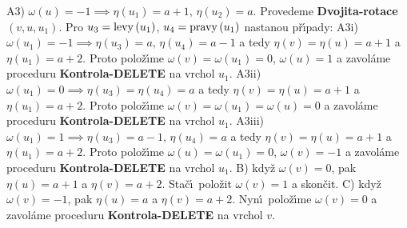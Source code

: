 \flushpar A3) $\omega \left(u\right)=-1\implies\eta \left(u_1\right)=a+1,\,\eta \left(u_2\right)=a$.  Provedeme 
{\bf Dvojita-rotace$\left(v,u,u_1\right)$}.  Pro $u_3=\operatorname{levy}\left(u_1\right)$, 
$u_4=\operatorname{pravy}\left(u_1\right)$ nastanou p\v r\'\i pady:\newline 
A3i) $\omega \left(u_1\right)=-1\implies\eta \left(u_3\right)=a,\,\eta \left(u_4\right)=a-1$ a tedy 
$\eta \left(v\right)=\eta \left(u\right)=a+1$ a $\eta \left(u_1\right)=a+2$. Proto polo\v z\'\i me 
$\omega \left(v\right)=\omega \left(u_1\right)=0$, $\omega \left(u\right)=1$ a zavol\'ame proceduru {\bf Kontrola-DELETE }
na vrchol $u_1$.\newline 
A3ii) $\omega \left(u_1\right)=0\implies\eta \left(u_3\right)=\eta \left(u_4\right)=a$ a tedy 
$\eta \left(v\right)=\eta \left(u\right)=a+1$ a $\eta \left(u_1\right)=a+2$. Proto polo\v z\'\i me 
$\omega \left(v\right)=\omega \left(u_1\right)=\omega \left(u\right)=0$ a zavol\'ame proceduru {\bf Kontrola-DELETE }
na vrchol $u_1$.\newline 
A3iii) $\omega \left(u_1\right)=1\implies\eta \left(u_3\right)=a-1,\,\eta \left(u_4\right)=a$ a tedy 
$\eta \left(v\right)=\eta \left(u\right)=a+1$ a $\eta \left(u_1\right)=a+2$. Proto polo\v z\'\i me 
$\omega \left(u\right)=\omega \left(u_1\right)=0$, $\omega \left(v\right)=-1$ a zavol\'ame proceduru {\bf Kontrola-DELETE }
na vrchol $u_1$.\newline 
B) kdy\v z $\omega \left(v\right)=0$, pak $\eta \left(u\right)=a+1$ a $\eta \left(v\right)=a+2$. 
Sta\v c\'\i\ polo\v zit $\omega \left(v\right)=1$ a skon\v cit.\newline 
C) kdy\v z $\omega \left(v\right)=-1$, pak $\eta \left(u\right)=a$ a $\eta \left(v\right)=a+2$. 
Nyn\'\i\ polo\v z\'\i me $\omega \left(v\right)=0$ a 
zavol\'ame proceduru {\bf Kontrola-DELETE} na vrchol $v$.
\medskip

